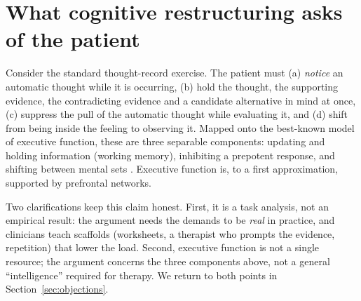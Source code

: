 \section{What cognitive restructuring asks of the patient}\label{sec:demands}
Consider the standard thought-record exercise. The patient must (a) \emph{notice} an automatic thought while it is occurring, (b) hold the thought, the supporting evidence, the contradicting evidence and a candidate alternative in mind at once, (c) suppress the pull of the automatic thought while evaluating it, and (d) shift from being inside the feeling to observing it. Mapped onto the best-known model of executive function, these are three separable components: updating and holding information (working memory), inhibiting a prepotent response, and shifting between mental sets \citep{miyake2000unity}. Executive function is, to a first approximation, supported by prefrontal networks.

Two clarifications keep this claim honest. First, it is a task analysis, not an empirical result: the argument needs the demands to be \emph{real} in practice, and clinicians teach scaffolds (worksheets, a therapist who prompts the evidence, repetition) that lower the load. Second, executive function is not a single resource; the argument concerns the three components above, not a general ``intelligence'' required for therapy. We return to both points in Section~\ref{sec:objections}.
